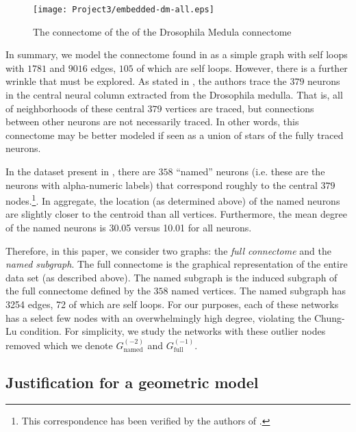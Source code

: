 \documentclass[11]{article}
\newcommand{\namedtwo}{G_{\textrm{named}}^{(-2)}}
\newcommand{\fullone}{G_{\textrm{full}}^{(-1)}}
\theoremstyle{remark}
\theoremstyle{definition}
\begin{document}
\begin{figure} [h]
  \centering
   \texttt{[image: Project3/embedded-dm-all.eps]}
   \caption{The connectome of the of the Drosophila Medula connectome}
  \label{fig:graphofconnectome}
\end{figure} 

In summary, we model the connectome found in \cite{neurodata} as a simple graph with self loops with $1781$ and $9016$ edges, $105$ of which are self loops. However, there is a further wrinkle that must be explored. As stated in \cite{naturenetwork}, the authors trace the $379$ neurons in the central neural column extracted from the Drosophila medulla. That is, all of neighborhoods of these central $379$ vertices are traced, but connections between other neurons are not necessarily traced. In other words, this connectome may be better modeled if seen as a union of stars of the fully traced neurons. 

In the dataset present in \cite{neurodata}, there are $358$ ``named'' neurons (i.e. these are the neurons with alpha-numeric labels) that {correspond roughly to the central $379$ nodes.}\footnote{This correspondence has been verified by the authors of \cite{neurodata}.}. In aggregate, the location (as determined above) of the named neurons are slightly closer to the centroid than all vertices. Furthermore, the mean degree of the named neurons is 30.05 versus 10.01 for all neurons.

Therefore, in this paper, we consider two graphs: the \emph{full connectome} and the \emph{named subgraph}. The full connectome is the graphical representation of the entire data set (as described above). The named subgraph is the induced subgraph of the full connectome defined by the $358$ named vertices. The named subgraph has 3254 edges, 72 of which are self loops. For our purposes, each of these networks has a select few nodes with an overwhelmingly high degree, violating the Chung-Lu condition. For simplicity, we study the networks with these outlier nodes removed which we denote $\namedtwo$ and $\fullone$.



\subsection{Justification for a geometric model \label{sec:geomjustification}}
\end{document}
